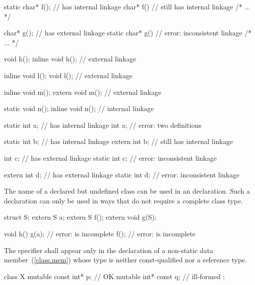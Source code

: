 \begin{codeblock}
static char* f();               //  has internal linkage
char* f()                       //  still has internal linkage
  { /* ... */ }

char* g();                      //  has external linkage
static char* g()                // error: inconsistent linkage
  { /* ... */ }

void h();
inline void h();                // external linkage

inline void l();
void l();                       // external linkage

inline void m();
extern void m();                // external linkage

static void n();
inline void n();                // internal linkage

static int a;                   //  has internal linkage
int a;                          // error: two definitions

static int b;                   //  has internal linkage
extern int b;                   //  still has internal linkage

int c;                          //  has external linkage
static int c;                   // error: inconsistent linkage

extern int d;                   //  has external linkage
static int d;                   // error: inconsistent linkage
\end{codeblock}
\exitexample

\pnum
{}%
The name of a declared but undefined class can be used in an
 declaration. Such a declaration can only be used in ways
that do not require a complete class type.
\enterexample

\begin{codeblock}
struct S;
extern S a;
extern S f();
extern void g(S);

void h() {
  g(a);                         // error:  is incomplete
  f();                          // error:  is incomplete
}
\end{codeblock}
\exitexample

\pnum
The  specifier shall appear only in the declaration of
a non-static data member~(\ref{class.mem})
whose type is neither const-qualified nor a reference type.
\enterexample

\begin{codeblock}
class X {
  mutable const int* p;         // OK
  mutable int* const q;         // ill-formed
};
\end{codeblock}
\exitexample

